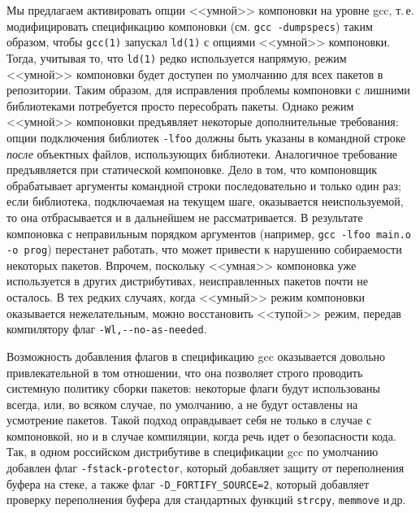 \documentclass[russian,a4paper,12pt,titlepage]{article}
\begin{document}
Мы предлагаем активировать опции <<умной>> компоновки на уровне gcc, т.\,е. модифицировать спецификацию компоновки
(см. \texttt{gcc -dumpspecs}) таким образом, чтобы \verb|gcc(1)| запускал \verb|ld(1)| с опциями <<умной>> компоновки.  Тогда, учитывая то,
что \verb|ld(1)| редко используется напрямую, режим <<умной>> компоновки будет доступен по умолчанию для всех пакетов в репозитории.
Таким образом, для исправления проблемы компоновки с лишними библиотеками потребуется просто пересобрать пакеты.  Однако режим
<<умной>> компоновки предъявляет некоторые дополнительные требования: опции подключения библиотек \verb|-lfoo| должны быть указаны
в командной строке \emph{после} объектных файлов, использующих библиотеки.  Аналогичное требование предъявляется при статической компоновке.
Дело в том, что компоновщик обрабатывает аргументы командной строки последовательно и только один раз; если библиотека, подключаемая
на текущем шаге, оказывается неиспользуемой, то она отбрасывается и в дальнейшем не рассматривается.  В результате компоновка
с неправильным порядком аргументов (например, \texttt{gcc -lfoo main.o -o prog}) перестанет работать, что может привести
к нарушению собираемости некоторых пакетов.  Впрочем, поскольку <<умная>> компоновка уже используется в других дистрибутивах,
неисправленных пакетов почти не осталось.  В тех редких случаях, когда <<умный>> режим компоновки оказывается нежелательным,
можно восстановить <<тупой>> режим, передав компилятору флаг \verb|-Wl,--no-as-needed|.

Возможность добавления флагов в спецификацию gcc оказывается довольно привлекательной в том отношении, что она позволяет
строго проводить системную политику сборки пакетов: некоторые флаги будут использованы всегда, или, во всяком случае,
по умолчанию, а не будут оставлены на усмотрение пакетов.  Такой подход оправдывает себя не только в случае с компоновкой,
но и в случае компиляции, когда речь идет о безопасности кода.  Так, в одном российском дистрибутиве в спецификации gcc
по умолчанию добавлен флаг \verb|-fstack-protector|, который добавляет защиту от переполнения буфера на стеке,
а также флаг \verb|-D_FORTIFY_SOURCE=2|, который добавляет проверку переполнения буфера для стандартных функций \verb|strcpy|,
\verb|memmove| и\,др.
\end{document}
